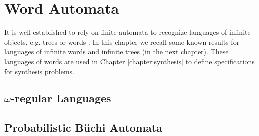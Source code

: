 \chapter{Word Automata}
It is well established to rely on finite automata to recognize languages of 
infinite objects, e.g. trees or words \cite{LangAutoLog}. In this chapter we
recall some known results for languages of infinite words and infinite trees 
(in the next chapter). These languages of words are used in Chapter 
\ref{chapter:synthesis} to define specifications for synthesis problems.

\section{$\omega$-regular Languages}


\section{Probabilistic Büchi Automata}

